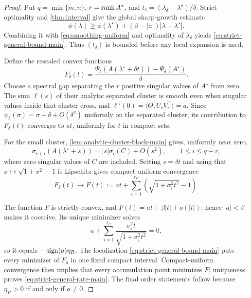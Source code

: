 \begin{proof}
Put \(q=\min\{m,n\}\), \(r=\operatorname{rank} A^\star\), and
\(t_\delta=(\lambda_\delta-\lambda^\star)/\delta\).  Strict optimality
and \cref{thm:interval} give the global sharp-growth estimate
\begin{equation}
 \phi(\lambda)\ge \phi(\lambda^\star)
 +(\beta-|a|)|\lambda-\lambda^\star|.
 \label{eq:strict-sharp-growth-main}
\end{equation}
Combining it with \eqref{eq:smoothing-uniform} and optimality of
\(\lambda_\delta\) yields \eqref{eq:strict-general-bound-main}.
Thus \((t_\delta)\) is bounded before any local expansion is used.

Define the rescaled convex functions
\[
 F_\delta(t)=
 \frac{\Psi_\delta(A(\lambda^\star+\delta t))
       -\Psi_\delta(A^\star)}{\delta}.
\]
Choose a spectral gap separating the \(r\) positive singular values of
\(A^\star\) from zero.  The sum \(\ell(s)\) of their analytic separated
cluster is smooth even when singular values inside that cluster cross, and
\(\ell'(0)=\langle\Theta,U_rV_r^\top\rangle=a\).  Since
\(\psi_\delta(\sigma)=\sigma-\delta+O(\delta^2)\) uniformly on the
separated cluster, its contribution to \(F_\delta(t)\) converges to \(at\),
uniformly for \(t\) in compact sets.

For the small cluster, \cref{lem:analytic-cluster-block-main} gives,
uniformly near zero,
\[
 \sigma_{r+i}(A(\lambda^\star+s))
 =|s|\sigma_i(C)+O(s^2),
 \qquad 1\le i\le q-r,
\]
where zero singular values of \(C\) are included.  Setting \(s=\delta t\)
and using that \(x\mapsto\sqrt{1+x^2}-1\) is Lipschitz gives compact-uniform
convergence
\begin{equation}
 F_\delta(t)\longrightarrow
 F(t):=at+\sum_{i=1}^{r_C}
 \left(\sqrt{1+\sigma_i^2t^2}-1\right).
 \label{eq:strict-epi-limit-main}
\end{equation}

The function \(F\) is strictly convex, and
\(F(t)=at+\beta|t|+o(|t|)\); hence \(|a|<\beta\) makes it coercive.
Its unique minimizer solves
\[
 a+\sum_{i=1}^{r_C}
 \frac{\sigma_i^2t}{\sqrt{1+\sigma_i^2t^2}}=0,
\]
so it equals \(-\operatorname{sign}(a)\eta_R\).  The localization
\eqref{eq:strict-general-bound-main} puts every minimizer of \(F_\delta\) in
one fixed compact interval.  Compact-uniform convergence then implies that
every accumulation point minimizes \(F\); uniqueness proves
\eqref{eq:strict-general-rate-main}.  The final order statements follow
because \(\eta_R>0\) if and only if \(a\ne0\).
\end{proof}

